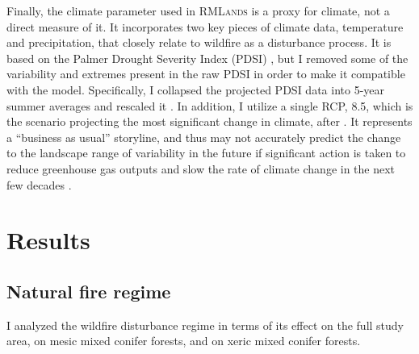 Finally, the climate parameter used in \textsc{RMLands} is a proxy for climate, not a direct measure of it. It incorporates two key pieces of climate data, temperature and precipitation, that closely relate to wildfire as a disturbance process. It is based on the Palmer Drought Severity Index (PDSI) \citep{HeimJr2002}, but I removed some of the variability and extremes present in the raw PDSI in order to make it compatible with the model. Specifically, I collapsed the projected PDSI data into 5-year summer averages and rescaled it \citep{Cushman2011}. In addition, I utilize a single RCP, 8.5, which is the scenario projecting the most significant change in climate, after \citet{Cook2014}. It represents a ``business as usual'' storyline, and thus may not accurately predict the change to the landscape range of variability in the future if significant action is taken to reduce greenhouse gas outputs and slow the rate of climate change in the next few decades \citep{Riahi2011}.







\section{Results}

\subsection*{Natural fire regime}

I analyzed the wildfire disturbance regime in terms of its effect on the full study area, on mesic mixed conifer forests, and on xeric mixed conifer forests.

